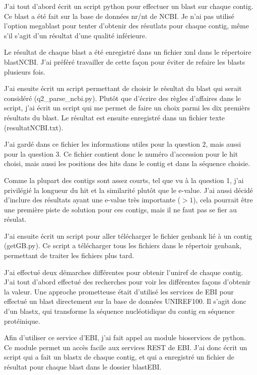 \documentclass[10.9pt]{article} %
\begin{document}
J'ai tout d'abord écrit un script python pour effectuer un blast sur chaque contig. Ce blast a été fait
sur la base de données nr/nt de NCBI. Je n'ai pas utilisé l'option megablast pour tenter d'obtenir
des résutlats pour chaque contig, même s'il s'agit d'un résultat d'une qualité inférieure.

Le résultat de chaque blast a été enregistré dans un fichier xml dans le répertoire blastNCBI. J'ai préféré
travailler de cette façon pour éviter de refaire les blasts plusieurs fois.

J'ai ensuite écrit un script permettant de choisir le résultat du blast qui serait considéré (q2\_parse\_ncbi.py). Plutôt que d'écrire
des règles d'affaires dans le script, j'ai écrit un script qui me permet de faire un choix parmi les dix premièrs
résultats du blast. Le résultat est ensuite enregistré dans un fichier texte (resultatNCBI.txt).

J'ai gardé dans ce fichier les informations utiles pour la question 2, mais aussi pour la question 3. Ce fichier contient donc
le numéro d'accession pour le hit choisi, mais aussi les positions des hits dans le contig et dans la séquence choisie.

Comme la plupart des contigs sont assez courts, tel que vu à la question 1, j'ai privilégié la longueur du hit
et la similarité plutôt que le e-value. J'ai aussi décidé d'inclure des résultats ayant une e-value très importante
($>1$), cela pourrait être une première piste de solution pour ces contigs, mais il ne faut pas se fier au résulat.

J'ai ensuite écrit un script pour aller télécharger le fichier genbank lié à un contig (getGB.py). Ce script
a télécharger tous les fichiers dans le répertoir genbank, permettant de traiter les fichiers plus tard.

J'ai effectué deux démarches différentes pour obtenir l'uniref de chaque contig. J'ai tout d'abord effectué
des recherches pour voir les différentes façons d'obtenir la valeur. Une approche prometteuse était d'utilisé
les services de EBI pour effectué un blast directement sur la base de données UNIREF100. Il s'agit donc d'un
blastx, qui transforme la séquence nucléotidique du contig en séquence protéinique. 

Afin d'utiliser ce service d'EBI, j'ai fait appel au module bioservices de python. Ce module permet un accès facile
aux services REST de EBI. J'ai donc écrit un script qui a fait un blastx de chaque contig, et qui a enregistré un
fichier de résultat pour chaque blast dans le dossier blastEBI.
\end{document}
